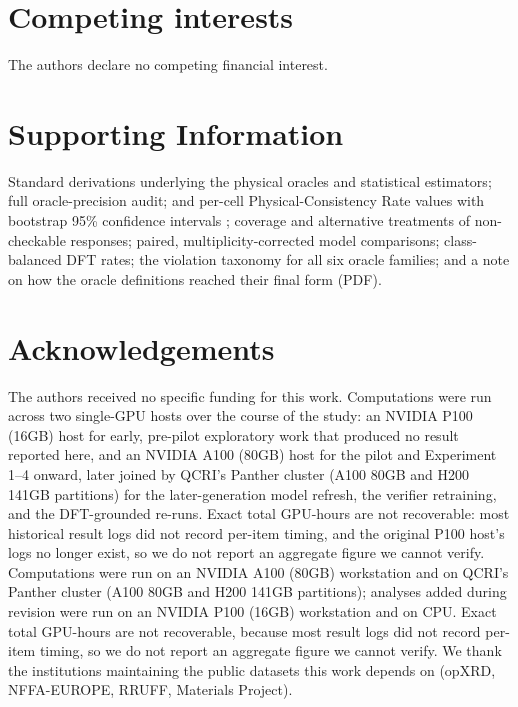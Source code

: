 \documentclass[pdflatex,sn-nature]{sn-jnl}
\newcommand{\rev}[1]{#1} %
\newcommand{\rev}[1]{{\color{blue}#1}} %
\providecommand{\DIFadd}[1]{{\protect\color{blue} \sf #1}} %
\providecommand{\DIFdel}[1]{{\protect\color{red} \scriptsize #1}} %
\providecommand{\DIFaddbegin}{} %
\providecommand{\DIFaddend}{} %
\providecommand{\DIFdelbegin}{} %
\providecommand{\DIFdelend}{} %
\providecommand{\DIFscaledelfig}{0.5}
\newlength{\DIFdelgraphicswidth} %
\newlength{\DIFdelgraphicsheight} %
\providecommand{\DIFaddincludegraphics}[2][]{{\color{blue}\fbox{\DIFOincludegraphics[#1]{#2}}}} %
\providecommand{\DIFdelincludegraphics}[2][]{%
\sbox{\DIFdelgraphicsbox}{\DIFOincludegraphics[#1]{#2}}%
\settoboxwidth{\DIFdelgraphicswidth}{\DIFdelgraphicsbox} %
\settoboxtotalheight{\DIFdelgraphicsheight}{\DIFdelgraphicsbox} %
\scalebox{\DIFscaledelfig}{%
\parbox[b]{\DIFdelgraphicswidth}{\usebox{\DIFdelgraphicsbox}\\[-\baselineskip] \rule{\DIFdelgraphicswidth}{0em}}\llap{\resizebox{\DIFdelgraphicswidth}{\DIFdelgraphicsheight}{%
\setlength{\unitlength}{\DIFdelgraphicswidth}%
\begin{picture}(1,1)%
\thicklines\linethickness{2pt} %
{\color[rgb]{1,0,0}\put(0,0){\framebox(1,1){}}}%
{\color[rgb]{1,0,0}\put(0,0){\line( 1,1){1}}}%
{\color[rgb]{1,0,0}\put(0,1){\line(1,-1){1}}}%
\end{picture}%
}\hspace*{3pt}}} %
} %
\DeclareRobustCommand{\DIFaddbegin}{\DIFOaddbegin \let\includegraphics\DIFaddincludegraphics} %
\DeclareRobustCommand{\DIFaddend}{\DIFOaddend \let\includegraphics\DIFOincludegraphics} %
\DeclareRobustCommand{\DIFdelbegin}{\DIFOdelbegin \let\includegraphics\DIFdelincludegraphics} %
\DeclareRobustCommand{\DIFdelend}{\DIFOaddend \let\includegraphics\DIFOincludegraphics} %
\begin{document}
\section*{Competing interests}
The authors declare no competing financial interest.

\section*{Supporting Information}
Standard derivations underlying the physical oracles and statistical estimators;
full oracle-precision audit; \DIFdelbegin \DIFdel{and }\DIFdelend per-cell Physical-Consistency Rate values with
bootstrap 95\% confidence intervals\DIFaddbegin \DIFadd{\rev{; coverage and alternative treatments of non-checkable
responses; paired, multiplicity-corrected model comparisons; class-balanced DFT rates; the violation
taxonomy for all six oracle families; and a note on how the oracle definitions reached their final
form} }\DIFaddend (PDF).

\section*{Acknowledgements}
The authors received no specific funding for this work.
\DIFdelbegin \DIFdel{Computations were run across two single-GPU hosts over the course of the study: an NVIDIA P100 (16GB) host for early, pre-pilot exploratory work that produced no result reported here, and an NVIDIA A100 (80GB) host for the pilot and Experiment 1--4 onward, later joined by QCRI's Panther cluster (A100 80GB and H200 141GB partitions) for the later-generation model refresh, the verifier retraining, and the DFT-grounded re-runs. Exact total GPU-hours are not recoverable: most historical result logs did not record per-item timing, and the original P100 host's logs no longer exist, so we do not report an aggregate figure we cannot verify. }\DIFdelend \DIFaddbegin \DIFadd{\rev{Computations were run on an NVIDIA A100 (80GB) workstation and on QCRI's Panther cluster (A100 80GB and H200 141GB partitions)}\rev{; analyses added during revision were run on an NVIDIA P100 (16GB) workstation and on CPU}. \rev{Exact total GPU-hours are not recoverable, because most result logs did not record per-item timing, so we do not report an aggregate figure we cannot verify.} }\DIFaddend We thank the institutions maintaining the public datasets this work depends on (opXRD, NFFA-EUROPE, RRUFF, Materials Project).


\end{document}
